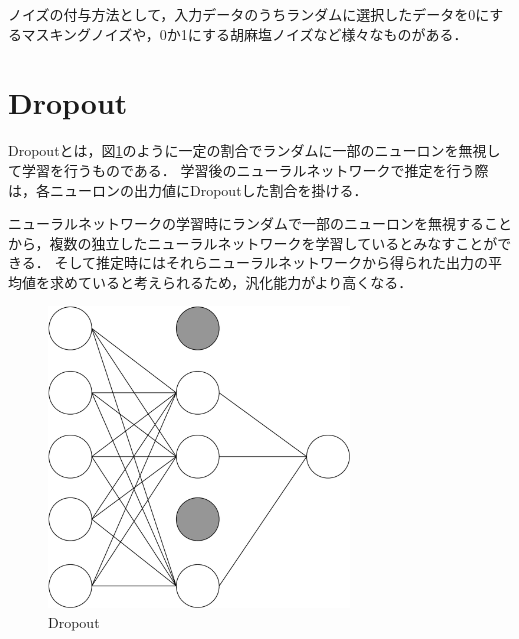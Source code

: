 ノイズの付与方法として，入力データのうちランダムに選択したデータを0にするマスキングノイズや，0か1にする胡麻塩ノイズなど様々なものがある．

\section{Dropout}
Dropoutとは，図\ref{dropout}のように一定の割合でランダムに一部のニューロンを無視して学習を行うものである．
学習後のニューラルネットワークで推定を行う際は，各ニューロンの出力値にDropoutした割合を掛ける．

ニューラルネットワークの学習時にランダムで一部のニューロンを無視することから，複数の独立したニューラルネットワークを学習しているとみなすことができる．
そして推定時にはそれらニューラルネットワークから得られた出力の平均値を求めていると考えられるため，汎化能力がより高くなる．

\begin{figure}[hbtp]
  \centering
  \includegraphics[bb=0 0 507 506, width=8cm]{Figures/dropout.pdf}
  \caption{Dropout}
  \label{dropout}
\end{figure}

